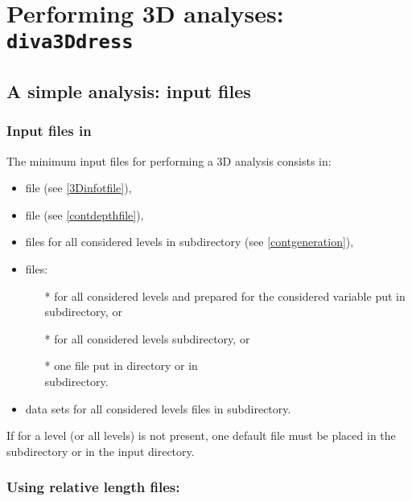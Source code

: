 \section{Performing 3D analyses: \texttt{diva3Ddress}}

\subsection{A simple analysis: input files}

\subsubsection{Input files in }

The minimum input files for performing a \diva 3D analysis consists in:

\begin{itemize}
\item {} file (see \ref{3Dinfotfile}),
\item {} file (see \ref{contdepthfile}),
\item {} files for all considered levels in  subdirectory (see \ref{contgeneration}),
\item {} files:
\begin{itemize}
\item[*]  for all considered levels and prepared for the considered variable put in  subdirectory, or
\item[*]  for all considered levels  subdirectory, or
\item[*] one  file put in   directory or in\\ 
 subdirectory.
\end{itemize}
\item data sets for all considered levels  files in   subdirectory.
\end{itemize}


\btips
 If for a level (or all levels)  is not present, one default   file must be placed in the  subdirectory or in the input directory.
\etips

\subsubsection{ Using relative length files:}


